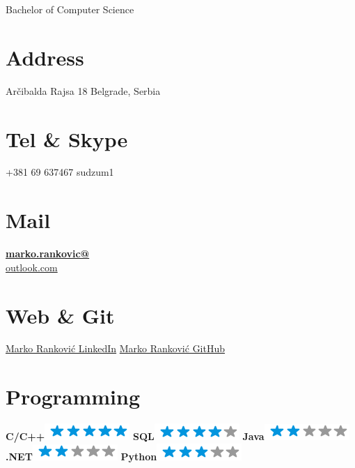 \documentclass[]{rankovic-cv}
\begin{document}
      {Bachelor of Computer Science}
      



\begin{aside}
  \section{Address}
    Arčibalda Rajsa 18
    Belgrade, Serbia
    ~
  \section{Tel \& Skype}
    +381 69 637467
    sudzum1
    ~
  \section{Mail}
    \href{mailto:marko.rankovic@outlook.com}{\textbf{marko.rankovic@}\\outlook.com}
    ~
  \section{Web \& Git}
    \href{https://www.linkedin.com/in/marko-rankovic-055034b0}{Marko Ranković LinkedIn}
    \href{https://github.com/marko-rankovic}{Marko Ranković GitHub}
    ~
  \section{Programming}
    \textbf{C/C++}\includegraphics[scale=0.40]{img/5stars.png}
    \textbf{SQL}\includegraphics[scale=0.40]{img/4stars.png}
    \textbf{Java}\includegraphics[scale=0.40]{img/2stars.png}
    \textbf{.NET}\includegraphics[scale=0.40]{img/2stars.png}
    \textbf{Python}\includegraphics[scale=0.40]{img/3stars.png}
    ~

\end{aside}
\end{document}
